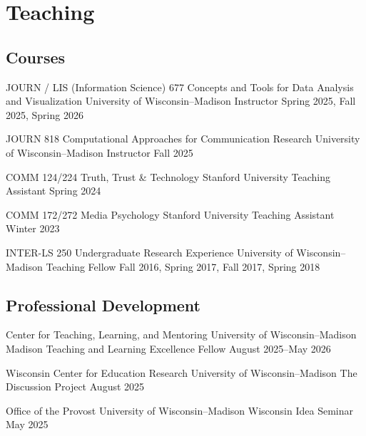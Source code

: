 \section{Teaching}

\subsection{Courses}

\cvcourse
  {JOURN / LIS (Information Science) 677}
  {Concepts and Tools for Data Analysis and Visualization}
  {University of Wisconsin--Madison}
  {Instructor}
  {Spring 2025, Fall 2025, Spring 2026}

\cvcourse
  {JOURN 818}
  {Computational Approaches for Communication Research}
  {University of Wisconsin--Madison}
  {Instructor}
  {Fall 2025}

\cvcourse
  {COMM 124/224}
  {Truth, Trust \& Technology}
  {Stanford University}
  {Teaching Assistant}
  {Spring 2024}

\cvcourse
  {COMM 172/272}
  {Media Psychology}
  {Stanford University}
  {Teaching Assistant}
  {Winter 2023}

\cvcourse
  {INTER-LS 250}
  {Undergraduate Research Experience}
  {University of Wisconsin--Madison}
  {Teaching Fellow}
  {Fall 2016, Spring 2017, Fall 2017, Spring 2018}

\subsection{Professional Development}

\cvservice
  {Center for Teaching, Learning, and Mentoring \textperiodcentered{} University of Wisconsin--Madison}
  {Madison Teaching and Learning Excellence Fellow}
  {}
  {August 2025--May 2026}

\cvservice
  {Wisconsin Center for Education Research \textperiodcentered{} University of Wisconsin--Madison}
  {The Discussion Project}
  {}
  {August 2025}

\cvservice
  {Office of the Provost \textperiodcentered{} University of Wisconsin--Madison}
  {Wisconsin Idea Seminar}
  {}
  {May 2025}
